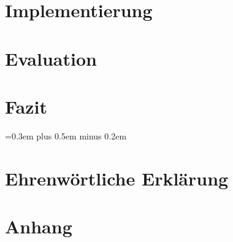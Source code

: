 \documentclass[
	12pt, %
	a4paper,
	bibliography=totoc, %
	numbers=noenddot, %
	ngerman, %
	headsepline, %
	oneside %
	]{scrbook} %
\begin{document}
\chapter{Implementierung}\label{ch:implementierung}


\chapter{Evaluation}\label{ch:bewertung}


\chapter{Fazit}\label{ch:fazit}


\spaceskip=0.3em plus 0.5em minus 0.2em
\printbibliography


\chapter*{Ehrenwörtliche Erklärung}
\pagestyle{empty}


\appendix
\chapter*{Anhang}
\pagestyle{empty}

\end{document}
